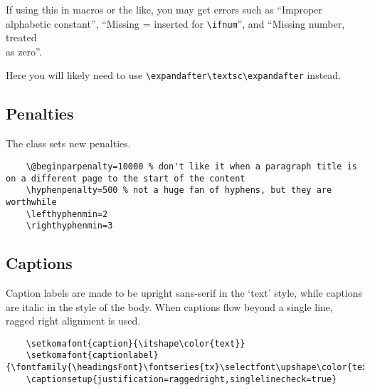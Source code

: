 \documentclass[solid,math,chem,code,plot,gloss]{bmc}
\begin{document}
\begin{warning}
    If using this in macros or the like,
    you may get errors such as
    {\ttfamily\small ``Improper alphabetic constant''},
    {\ttfamily\small ``Missing = inserted for \texttt{\small \textbackslash ifnum}''},
    and {\ttfamily\small ``Missing number, treated \\ as zero''}.

    Here you will likely need to use
    \texttt{\small \textbackslash expandafter\textbackslash textsc\textbackslash expandafter} instead.
\end{warning}

\subsection{Penalties}
The class sets new penalties.
\begin{verbatim}
    \@beginparpenalty=10000 % don't like it when a paragraph title is on a different page to the start of the content
    \hyphenpenalty=500 % not a huge fan of hyphens, but they are worthwhile
    \lefthyphenmin=2
    \righthyphenmin=3
\end{verbatim}

\subsection{Captions}
Caption labels are made to be upright sans-serif in the `text' style,
while captions are italic in the style of the body.
When captions flow beyond a single line, ragged right alignment is used.

\begin{verbatim}
    \setkomafont{caption}{\itshape\color{text}}
    \setkomafont{captionlabel}{\fontfamily{\headingsFont}\fontseries{tx}\selectfont\upshape\color{text}}
    \captionsetup{justification=raggedright,singlelinecheck=true}
\end{verbatim}
\end{document}
